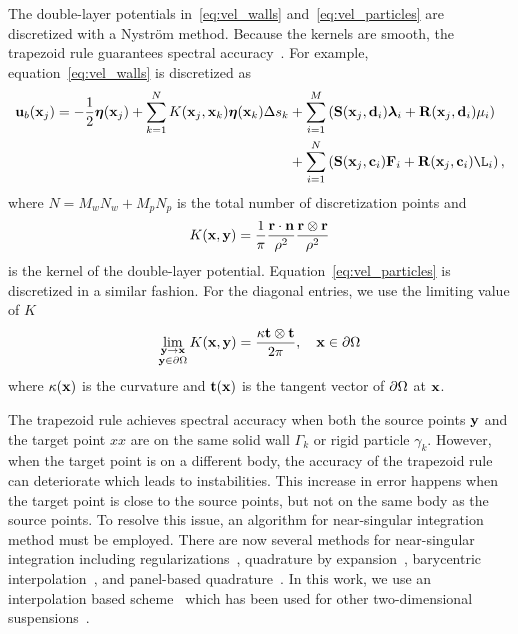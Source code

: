\documentclass[preprint, 10pt]{elsarticle}
\begin{document}
The double-layer potentials in~\eqref{eq:vel_walls}
and~\eqref{eq:vel_particles} are discretized with a Nystr\"om method.
Because the kernels are smooth, the trapezoid rule guarantees spectral
accuracy~\cite{tre-wei2014}.  For example,
equation~\eqref{eq:vel_walls} is discretized as
\begin{equation*}
  \begin{aligned}
  \uu_b(\xx_j) = -\frac{1}{2}\eeta(\xx_j) + 
  \sum_{k=1}^{N} K(\xx_j,\xx_k) \eeta(\xx_k) \Delta s_k
    &+ \sum_{i=1}^{M} \left(\mathbf{S}(\xx_j,\dd_i)\llambda_i +
    \mathbf{R}(\xx_j,\dd_i)\mu_i\right)  \\
    &+ \sum_{i=1}^{N} \left(\mathbf{S}(\xx_j,\cc_i)\FF_i +
    \mathbf{R}(\xx_j,\cc_i)\L_i\right),
  \end{aligned}
\end{equation*}
where $N = M_w N_w + M_p N_p$ is the total number of discretization
points and
\begin{align*}
  K({\mathbf{x}},{\mathbf{y}}) = \frac{1}{\pi} \frac{{\mathbf{r}} \cdot {\mathbf{n}}}{\rho^2} 
               \frac{{\mathbf{r}} \otimes {\mathbf{r}}}{\rho^2}
\end{align*}
is the kernel of the double-layer potential.
Equation~\eqref{eq:vel_particles} is discretized in a similar fashion.
For the diagonal entries, we use the limiting value of $K$
\begin{align*}
  \lim_{\substack{{\mathbf{y}} \rightarrow {\mathbf{x}} \\ {\mathbf{y}} \in {\partial}\Omega}} K({\mathbf{x}},{\mathbf{y}}) = 
  \frac{\kappa{\mathbf{t}}\otimes{\mathbf{t}}}{2\pi},
    \quad {\mathbf{x}} \in {\partial}\Omega
\end{align*}
where $\kappa({\mathbf{x}})$ is the curvature and ${\mathbf{t}}({\mathbf{x}})$ is the tangent
vector of ${\partial}\Omega$ at ${\mathbf{x}}$.

The trapezoid rule achieves spectral accuracy when both the source
points ${\mathbf{y}}$ and the target point $xx$ are on the same solid wall
$\Gamma_k$ or rigid particle $\gamma_k$.  However, when the target point
is on a different body, the accuracy of the trapezoid rule can
deteriorate which leads to instabilities.  This increase in error
happens when the target point is close to the source points, but not on
the same body as the source points.  To resolve this issue, an algorithm
for near-singular integration method must be employed.  There are now
several methods for near-singular integration including
regularizations~\cite{bea-yin-wil2016, bea-lai2001}, quadrature by
expansion~\cite{Klockner2013}, barycentric
interpolation~\cite{bar-wu-vee2015}, and panel-based
quadrature~\cite{hel-oja2008}.  In this work, we use an interpolation
based scheme~\cite{Ying2006} which has been used for other
two-dimensional suspensions~\cite{Quaife2014}.
\end{document}

